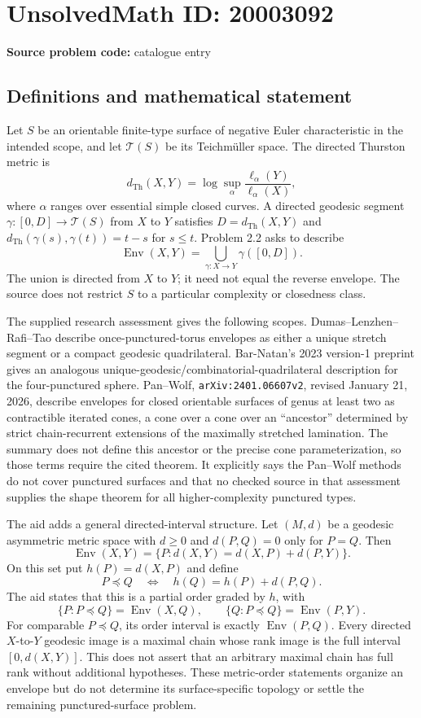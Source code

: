 \documentclass[11pt]{article}
\begin{document}
\section*{UnsolvedMath ID: 20003092}
\textbf{Source problem code:} catalogue entry
\subsection{Definitions and mathematical statement}
Let $S$ be an orientable finite-type surface of negative Euler characteristic in the intended scope, and let $\mathcal T(S)$ be its Teichm\"uller space. The directed Thurston metric is
\[
 d_{\mathrm{Th}}(X,Y)=\log\sup_{\alpha}
       \frac{\ell_\alpha(Y)}{\ell_\alpha(X)},
\]
where $\alpha$ ranges over essential simple closed curves. A directed geodesic segment $\gamma:[0,D]\to\mathcal T(S)$ from $X$ to $Y$ satisfies $D=d_{\mathrm{Th}}(X,Y)$ and $d_{\mathrm{Th}}(\gamma(s),\gamma(t))=t-s$ for $s\leq t$. Problem 2.2 asks to describe
\[
 \operatorname{Env}(X,Y)=\bigcup_{\gamma:X\to Y}\gamma([0,D]).
\]
The union is directed from $X$ to $Y$; it need not equal the reverse envelope. The source does not restrict $S$ to a particular complexity or closedness class.

The supplied research assessment gives the following scopes. Dumas--Lenzhen--Rafi--Tao describe once-punctured-torus envelopes as either a unique stretch segment or a compact geodesic quadrilateral. Bar-Natan's 2023 version-1 preprint gives an analogous unique-geodesic/combinatorial-quadrilateral description for the four-punctured sphere. Pan--Wolf, \texttt{arXiv:2401.06607v2}, revised January 21, 2026, describe envelopes for closed orientable surfaces of genus at least two as contractible iterated cones, a cone over a cone over an ``ancestor'' determined by strict chain-recurrent extensions of the maximally stretched lamination. The summary does not define this ancestor or the precise cone parameterization, so those terms require the cited theorem. It explicitly says the Pan--Wolf methods do not cover punctured surfaces and that no checked source in that assessment supplies the shape theorem for all higher-complexity punctured types.

The aid adds a general directed-interval structure. Let $(M,d)$ be a geodesic asymmetric metric space with $d\geq0$ and $d(P,Q)=0$ only for $P=Q$. Then
\[
 \operatorname{Env}(X,Y)=
 \{P:d(X,Y)=d(X,P)+d(P,Y)\}.
\]
On this set put $h(P)=d(X,P)$ and define
\[
 P\preceq Q\quad\Longleftrightarrow\quad
 h(Q)=h(P)+d(P,Q).
\]
The aid states that this is a partial order graded by $h$, with
\[
 \{P:P\preceq Q\}=\operatorname{Env}(X,Q),\qquad
 \{Q:P\preceq Q\}=\operatorname{Env}(P,Y).
\]
For comparable $P\preceq Q$, its order interval is exactly $\operatorname{Env}(P,Q)$. Every directed $X$-to-$Y$ geodesic image is a maximal chain whose rank image is the full interval $[0,d(X,Y)]$. This does not assert that an arbitrary maximal chain has full rank without additional hypotheses. These metric-order statements organize an envelope but do not determine its surface-specific topology or settle the remaining punctured-surface problem.
\end{document}

